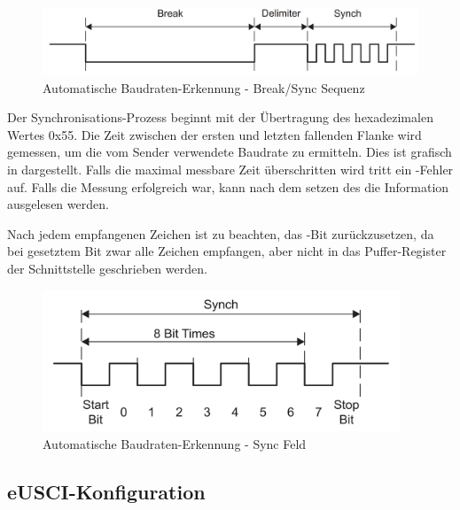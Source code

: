 \begin{figure}[h!]
	\centering
	\includegraphics[width=1.0\textwidth]{../Bilder/auto_baud.png}
	\caption{Automatische Baudraten-Erkennung - Break/Sync Sequenz\\}
	\label{fig:auto_baud}
\end{figure}

\newpage
Der Synchronisations-Prozess beginnt mit der \"Ubertragung des hexadezimalen Wertes 0x55. Die Zeit zwischen der ersten und letzten fallenden Flanke wird gemessen, um die vom Sender verwendete Baudrate zu ermitteln. Dies ist grafisch in  dargestellt. Falls die maximal messbare Zeit \"uberschritten wird tritt ein -Fehler auf. Falls die Messung erfolgreich war, kann nach dem setzen des  die Information ausgelesen werden. 

Nach jedem empfangenen Zeichen ist zu beachten, das -Bit zur\"uckzusetzen, da bei gesetztem Bit zwar alle Zeichen empfangen, aber nicht in das Puffer-Register der Schnittstelle geschrieben werden. 

\vspace{1cm}
\begin{figure}[h!]
	\centering
	\includegraphics[width=0.95\textwidth]{../Bilder/sync_field.png}
	\caption{Automatische Baudraten-Erkennung - Sync Feld\\}
	\label{fig:sync_field}
\end{figure}

\newpage
\subsection{eUSCI-Konfiguration}
\label{sec:eUSCI_Konfiguration}

